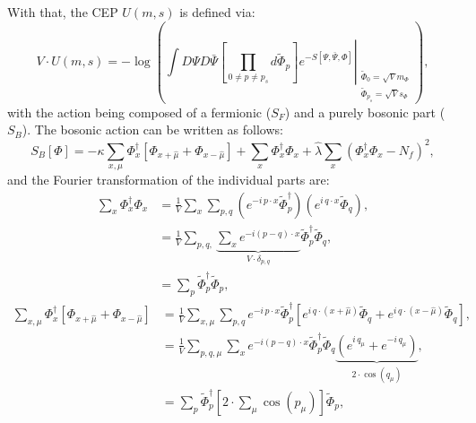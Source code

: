 With that, the CEP $U(m,s)$ is defined via:
\begin{equation}\label{eq:def_CEP}
 V\cdot U(m,s) = -\log \left(\int D\Psi D\bar\Psi \left. \left[\prod\limits_{0 \neq p \neq p_s}  d \tilde \Phi_p \right]
          e^{-S[\Psi,\bar\Psi,\Phi]} 
          \right|_{ \begin{array}{l} \scriptscriptstyle \tilde \Phi_0=\sqrt{V} m_{\Phi} \\ 
                                     \scriptscriptstyle \tilde \Phi_{p_s}=\sqrt{V}s_{\Phi} \end{array}}  \right),
\end{equation}
with the action being composed of a fermionic ($S_F$) and a purely bosonic part ($S_B$).
The bosonic action can be written as follows:
\begin{equation}\label{eq:def_bosonicActionInLatticeNotation}
 S_B[\Phi] = -\kappa \sum\limits_{x,\mu} \Phi_x^{\dagger} \left[\Phi_{x+\hat\mu} + \Phi_{x-\hat\mu} \right] 
              + \sum\limits_x \Phi_x^{\dagger} \Phi_x 
              + \hat{\lambda} \sum\limits_x \left( \Phi_x^{\dagger} \Phi_x - N_f\right)^2 ,
\end{equation}
and the Fourier transformation of the individual parts are:
\begin{align}
 \sum\limits_{x} \Phi_x^{\dagger} \Phi_x &= 
                     \frac{1}{V}  \sum\limits_{x}  \sum\limits_{p,q}  \left( e^{-i\, p \cdot x}  \tilde\Phi_p^{\dagger} \right)
                     \left( e^{i\, q \cdot x}  \tilde\Phi_{q} \right), \nonumber \\
                  &= \frac{1}{V}  \sum\limits_{p,q,}  
                     \underbrace{ \sum\limits_{x}  e^{ -i (p - q) \cdot x} }_{V \cdot \delta_{p,q}}  \tilde\Phi_p^{\dagger} \tilde\Phi_q ,
                     \nonumber \\
                  &= \sum\limits_{p}  \tilde\Phi_p^{\dagger} \tilde\Phi_p 
                      \label{eq:FourierTrafoPhiSquared},
\end{align}
% 
\begin{align}
 \sum\limits_{x,\mu} \Phi_x^{\dagger} \left[\Phi_{x+\hat\mu} + \Phi_{x-\hat\mu} \right] &= 
                     \frac{1}{V}  \sum\limits_{x,\mu}  \sum\limits_{p,q}   e^{-i\, p \cdot x}  \tilde\Phi_p^{\dagger} 
                     \left[  e^{i\, q \cdot (x+\hat\mu)}  \tilde\Phi_{q}   +   e^{i\, q \cdot (x-\hat\mu)}  \tilde\Phi_{q}  \right], \nonumber \\
                  &= \frac{1}{V}  \sum\limits_{p,q,\mu}  
                     \sum\limits_{x}  e^{ -i (p - q) \cdot x}  \tilde\Phi_p^{\dagger} \tilde\Phi_q 
                     \underbrace{ \left(  e^{i\, q_{\mu}}  +  e^{-i\, q_{\mu}} \right)  }_{ 2\cdot \cos(q_{\mu}) }, \nonumber \\
                  &= \sum\limits_{p}  \tilde\Phi_p^{\dagger} \left[  2 \cdot \sum\limits_{\mu} \cos(p_{\mu})  \right]  \tilde\Phi_p 
                      \label{eq:FourierTrafoKappaTerm},
\end{align}
